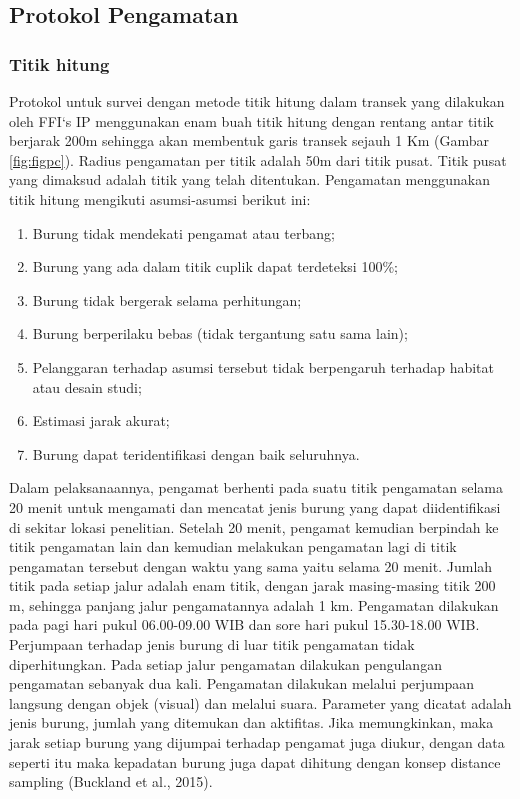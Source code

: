 \documentclass[
]{book}
\providecommand{\tightlist}{%
  \setlength{\itemsep}{0pt}\setlength{\parskip}{0pt}}
\begin{document}
\hypertarget{protokol-pengamatan}{%
\subsection*{Protokol Pengamatan}\label{protokol-pengamatan}}

\hypertarget{titik-hitung}{%
\subsubsection*{Titik hitung}\label{titik-hitung}}

Protokol untuk survei dengan metode titik hitung dalam transek yang dilakukan oleh FFI`s IP menggunakan enam buah titik hitung dengan rentang antar titik berjarak 200m sehingga akan membentuk garis transek sejauh 1 Km (Gambar \ref{fig:figpc}). Radius pengamatan per titik adalah 50m dari titik pusat. Titik pusat yang dimaksud adalah titik yang telah ditentukan. Pengamatan menggunakan titik hitung mengikuti asumsi-asumsi berikut ini:

\begin{enumerate}
\def\labelenumi{\arabic{enumi}.}
\tightlist
\item
  Burung tidak mendekati pengamat atau terbang;
\item
  Burung yang ada dalam titik cuplik dapat terdeteksi 100\%;
\item
  Burung tidak bergerak selama perhitungan;
\item
  Burung berperilaku bebas (tidak tergantung satu sama lain);
\item
  Pelanggaran terhadap asumsi tersebut tidak berpengaruh terhadap habitat atau desain studi;
\item
  Estimasi jarak akurat;
\item
  Burung dapat teridentifikasi dengan baik seluruhnya.
\end{enumerate}

Dalam pelaksanaannya, pengamat berhenti pada suatu titik pengamatan selama 20 menit untuk mengamati dan mencatat jenis burung yang dapat diidentifikasi di sekitar lokasi penelitian. Setelah 20 menit, pengamat kemudian berpindah ke titik pengamatan lain dan kemudian melakukan pengamatan lagi di titik pengamatan tersebut dengan waktu yang sama yaitu selama 20 menit. Jumlah titik pada setiap jalur adalah enam titik, dengan jarak masing-masing titik 200 m, sehingga panjang jalur pengamatannya adalah 1 km. Pengamatan dilakukan pada pagi hari pukul 06.00-09.00 WIB dan sore hari pukul 15.30-18.00 WIB. Perjumpaan terhadap jenis burung di luar titik pengamatan tidak diperhitungkan. Pada setiap jalur pengamatan dilakukan pengulangan pengamatan sebanyak dua kali. Pengamatan dilakukan melalui perjumpaan langsung dengan objek (visual) dan melalui suara. Parameter yang dicatat adalah jenis burung, jumlah yang ditemukan dan aktifitas. Jika memungkinkan, maka jarak setiap burung yang dijumpai terhadap pengamat juga diukur, dengan data seperti itu maka kepadatan burung juga dapat dihitung dengan konsep distance sampling (Buckland et al., 2015).
\end{document}
